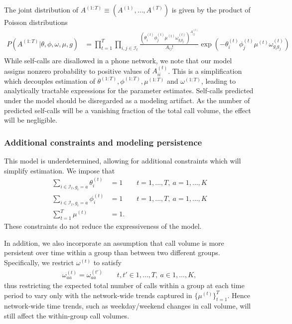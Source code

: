 \documentclass{article}
\begin{document}
The joint distribution of $A^{(1:T)} \equiv (A^{(1)},\ldots,A^{(T)})$ is given by the product of Poisson distributions
\begin{align*}
P(A^{(1:T)}|\theta,\phi,\omega,\mu,g) & = \prod_{t=1}^T \prod_{i, j \in \mathcal{I}_t} \frac{\left(\theta_i^{(t)} \phi_j^{(t)} \mu^{(t)} \omega_{g_i g_j}^{(t)}\right)^{A_{ij}^{(t)}}}{A_{ij}!} \exp\left(- \theta_i^{(t)} \phi_j^{(t)} \mu^{(t)} \omega_{g_i g_j}^{(t)}\right) \\
\end{align*}
While self-calls are disallowed in a phone network, we note that our model assigns nonzero probability to positive values of $A_{ii}^{(t)}$. This is a simplification which decouples estimation of $\theta^{(1:T)}, \phi^{(1:T)}, \mu^{(1:T)}$ and $\omega^{(1:T)}$, leading to analytically tractable expressions for the parameter estimates. Self-calls predicted under the model should be disregarded as a modeling artifact. As the number of predicted self-calls will be a vanishing fraction of the total call volume, the effect will be negligible.


\subsubsection{Additional constraints and modeling persistence}

This model is underdetermined, allowing for additional constraints which will simplify estimation. We impose that
\begin{align*}
\sum_{i \in \mathcal{I}_t, g_i=a} \theta_i^{(t)} & = 1 \qquad t=1,\ldots,T,\ a=1,\ldots,K\\
\sum_{i \in \mathcal{I}_t, g_i=a} \phi_i^{(t)} & = 1 \qquad t=1,\ldots,T,\ a=1,\ldots,K\\
\sum_{t=1}^T \mu^{(t)} & = 1.
\end{align*}
These constraints do not reduce the expressiveness of the model.

In addition, we also incorporate an assumption that call volume is more persistent over time within a group than between two different groups. Specifically, we restrict $\omega^{(t)}$ to satisfy
\begin{align} \label{eq:constraint}
\omega_{aa}^{(t)} = \omega_{aa}^{(t')} \qquad t,t' \in 1,\ldots,T, \ a\in 1,\ldots,K,
\end{align}
thus restricting the expected total number of calls within a group at each time period to vary only with the network-wide trends captured in $\{\mu^{(t)}\}_{t=1}^T$. Hence network-wide time trends, such as weekday/weekend changes in call volume, will still affect the within-group call volumes.
\end{document}
